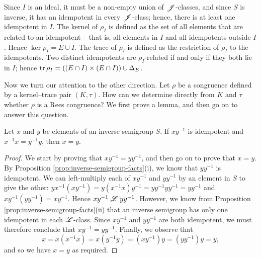 Since $I$ is an ideal, it must be a non-empty union of $\mathrel{\mathscr{J}}$-classes, and since $S$ is
inverse, it has an idempotent in every $\mathrel{\mathscr{J}}$-class; hence, there is at least one
idempotent in $I$.  The kernel of $\rho_I$ is defined as the set of all elements
that are related to an idempotent -- that is, all elements in $I$ and all
idempotents outside $I$.  Hence $\ker \rho_I = E \cup I$.  The trace of $\rho_I$
is defined as the restriction of $\rho_I$ to the idempotents.  Two distinct
idempotents are $\rho_I$-related if and only if they both lie in $I$; hence
$\operatorname{tr} \rho_I = \left((E \cap I) \times (E \cap I)\right) \cup \Delta_E$.

Now we turn our attention to the other direction.  Let $\rho$ be a congruence
defined by a kernel--trace pair $(K, \tau)$.  How can we determine directly from
$K$ and $\tau$ whether $\rho$ is a Rees congruence?  We first prove a lemma, and
then go on to answer this question.

\begin{lemma}
  \label{lem:xly}
  Let $x$ and $y$ be elements of an inverse semigroup $S$.  If $xy^{-1}$ is
  idempotent and $x^{-1}x = y^{-1}y$, then $x = y$.
  \begin{proof}
    We start by proving that $xy^{-1} = yy^{-1}$, and then go on to prove that
    $x=y$.  By Proposition \ref{prop:inverse-semigroup-facts}(i), we know that
    $yy^{-1}$ is idempotent.  We can left-multiply each of $xy^{-1}$ and
    $yy^{-1}$ by an element in $S$ to give the other:
    $yx^{-1}(xy^{-1}) = y(x^{-1}x)y^{-1} = yy^{-1}yy^{-1} = yy^{-1}$ and
    $xy^{-1}(yy^{-1}) = xy^{-1}$.  Hence $xy^{-1} \mathrel{\mathscr{L}} yy^{-1}$.  However, we
    know from Proposition \ref{prop:inverse-semigroup-facts}(ii) that an inverse
    semigroup has only one idempotent in each $\mathrel{\mathscr{L}}$-class.  Since $xy^{-1}$ and
    $yy^{-1}$ are both idempotent, we must therefore conclude that
    $xy^{-1} = yy^{-1}$.  Finally, we observe that
    $$x = x(x^{-1}x) = x(y^{-1}y) = (xy^{-1})y = (yy^{-1})y = y,$$
    and so we have $x=y$ as required.
  \end{proof}
\end{lemma}

